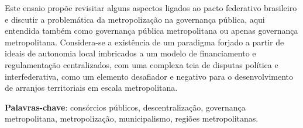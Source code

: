 \documentclass[
article,			%
11pt,				%
oneside,			%
a4paper,			%
english,			%
brazil,				%
sumario=tradicional
]{abntex2}
\begin{document}
	
	
	\frenchspacing 
	
	
	\maketitle
		
	\begin{resumoumacoluna}
		
		Este ensaio propõe revisitar alguns aspectos ligados ao pacto federativo brasileiro e discutir a problemática da metropolização na governança pública, aqui entendida também como governança pública metropolitana ou apenas governança metropolitana. Considera-se a existência de um paradigma forjado a partir de ideais de autonomia local imbricados a um modelo de financiamento e regulamentação centralizados, com uma complexa teia de disputas política e interfederativa, como um elemento desafiador e negativo para o desenvolvimento de arranjos territoriais em escala metropolitana.
		
		\vspace{\onelineskip}
		
		\noindent
		\textbf{Palavras-chave}: consórcios públicos, descentralização, governança metropolitana, metropolização, municipalismo, regiões metropolitanas.
	\end{resumoumacoluna}

\end{document}
